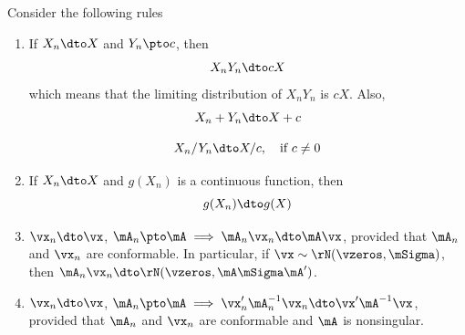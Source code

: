 \documentclass[english,12pt]{book}\usepackage[]{graphicx}\usepackage[]{xcolor}
\begin{document}
\begin{theorem}\label{teo:rules_dto}

Consider the following rules
\begin{enumerate}
  \item If $X_n\dto X$ and $Y_n\pto c$, then
      \begin{equation}\label{eq:rule_dtop}
         X_nY_n \dto cX
      \end{equation}
%
      which means that the limiting distribution of $X_nY_n$ is $cX$. Also, 
        \begin{equation}\label{eq:rule_dtop_2}
            X_n + Y_n \dto X + c
        \end{equation}
        
        \begin{equation}\label{eq:rule_dtop_3}
            X_n / Y_n \dto X / c, \quad \mbox{if $c\neq 0$}
        \end{equation}
        
    \item If $X_n\dto X$ and $g(X_n)$ is a continuous function, then
          \begin{equation}\label{eq:rule_dtop_4}
            g(X_n)\dto g(X)
          \end{equation}
    \item $\vx_n \dto \vx$, $\mA_n\pto \mA \implies \mA_n\vx_n \dto \mA\vx$, provided that $\mA_n$ and $\vx_n$ are conformable. In particular, if $\vx \sim \rN(\vzeros, \mSigma)$, then $\mA_n\vx_n\dto \rN(\vzeros, \mA\mSigma\mA')$.
    \item $\vx_n \dto \vx$, $\mA_n\pto \mA \implies \vx_n'\mA_n^{-1}\vx_n\dto \vx'\mA^{-1}\vx$, provided that $\mA_n$ and $\vx_n$ are conformable and $\mA$ is nonsingular.
\end{enumerate}
\end{theorem}
\end{document}
